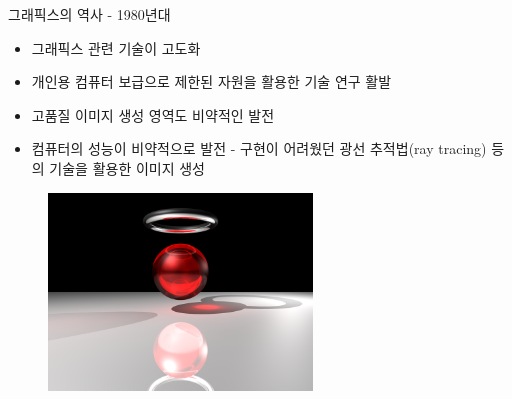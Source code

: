 \documentclass{beamer}
\begin{document}
\begin{frame}{그래픽스의 역사 - 1980년대}

\begin{itemize}
\item 그래픽스 관련 기술이 고도화
\item 개인용 컴퓨터 보급으로 제한된 자원을 활용한 기술 연구 활발
\item 고품질 이미지 생성 영역도 비약적인 발전
\item 컴퓨터의 성능이 비약적으로 발전 - 구현이 어려웠던 광선 추적법(ray tracing) 등의 기술을 활용한 이미지 생성
\end{itemize}

\begin{figure}
    \includegraphics[width=7cm]{OGL_intro/raytracing.png}
\end{figure}

\end{frame}
\end{document}
